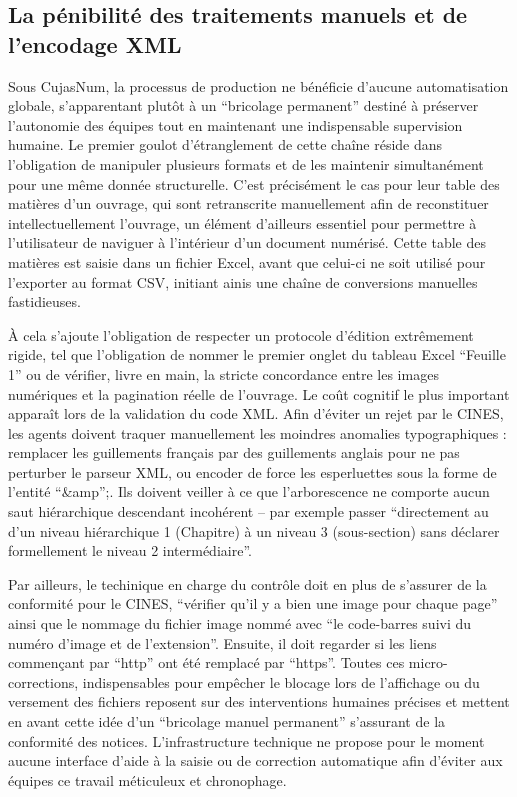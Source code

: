 \subsection{La pénibilité des traitements manuels et de l'encodage XML}
Sous CujasNum, la processus de production ne bénéficie d'aucune automatisation globale, s'apparentant plutôt à un \enquote{bricolage permanent} destiné à préserver l'autonomie des équipes tout en maintenant une indispensable supervision humaine. Le premier goulot d'étranglement de cette chaîne réside dans l'obligation de manipuler plusieurs formats et de les maintenir simultanément pour une même donnée structurelle. C'est précisément le cas pour leur table des matières d'un ouvrage, qui sont retranscrite manuellement afin de reconstituer intellectuellement l'ouvrage, un élément d'ailleurs essentiel pour permettre à l'utilisateur de naviguer à l'intérieur d'un document numérisé. Cette table des matières est saisie dans un fichier Excel, avant que celui-ci ne soit utilisé pour l'exporter au format CSV, initiant ainis une chaîne de conversions manuelles fastidieuses.

À cela s'ajoute l'obligation de respecter un protocole d'édition extrêmement rigide, tel que l'obligation de nommer le premier onglet du tableau Excel \enquote{Feuille 1} ou de vérifier, livre en main, la stricte concordance entre les images numériques et la pagination réelle de l'ouvrage. Le coût cognitif le plus important apparaît lors de la validation du code XML. Afin d'éviter un rejet par le CINES, les agents doivent traquer manuellement les moindres anomalies typographiques : remplacer les guillements français par des guillements anglais pour ne pas perturber le parseur XML, ou encoder de force les esperluettes sous la forme de l'entité \enquote{\&amp};. Ils doivent veiller à ce que l'arborescence ne comporte aucun saut hiérarchique descendant incohérent -- par exemple passer \enquote{directement au d'un niveau hiérarchique 1 (Chapitre) à un niveau 3 (sous-section) sans déclarer formellement le niveau 2 intermédiaire}. 

Par ailleurs, le techinique en charge du contrôle doit en plus de s'assurer de la conformité pour le CINES, \enquote{vérifier qu'il y a bien une image pour chaque page} ainsi que le nommage du fichier image nommé avec \enquote{le code-barres suivi du numéro d'image et de l'extension}. Ensuite, il doit regarder si les liens commençant par \enquote{http} ont été remplacé par \enquote{https}. Toutes ces micro-corrections, indispensables pour empêcher le blocage lors de l'affichage ou du versement des fichiers reposent sur des interventions humaines précises et mettent en avant cette idée d'un \enquote{bricolage manuel permanent} s'assurant de la conformité des notices. L'infrastructure technique ne propose pour le moment aucune interface d'aide à la saisie ou de correction automatique afin d'éviter aux équipes ce travail méticuleux et chronophage. 

